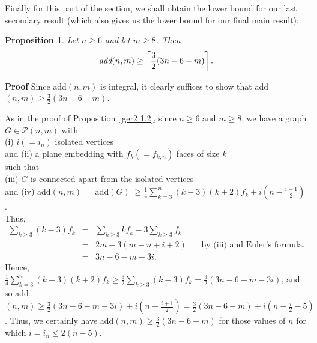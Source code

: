 \documentclass{article}
\newtheorem{Proposition}[Theorem]{Proposition}
\newtheorem{Proof of Theorem}{Proof of Theorem}
\begin{document}
Finally for this part of the section,
we shall obtain the lower bound for our last secondary result
(which also gives us the lower bound for our final main result):















\begin{Proposition} \label{add712}
Let $n \geq 6$ and let $m \geq 8$.
Then 
\begin{displaymath}
\emph{add}(n,m) \geq \left \lceil \frac{3}{2} (3n-6-m) \right \rceil.
\end{displaymath}
\end{Proposition}
\textbf{Proof}
Since add$(n,m)$ is integral,
it clearly suffices to show that
add$(n,m) \geq \frac{3}{2} (3n-6-m)$.

As in the proof of Proposition~\ref{ger2 1.2},
since $n \geq 6$ and $m \geq 8$,
we have a graph $G \in \mathcal{P}(n,m)$ with \\
(i) $i(=i_{n})$ isolated vertices \\
and (ii) a plane embedding with $f_{k}(=f_{k,n})$ faces of size $k$ \\
such that \\
(iii) $G$ is connected apart from the isolated vertices \\
and (iv) add$(n,m) = |\textrm{add}(G)| \geq 
\frac{1}{4} \sum_{k=3}^{n}(k-3)(k+2)f_{k} +i(n- \frac{i+1}{2})$. \\

Thus,
\begin{eqnarray*}
\sum_{k \geq 3} (k-3) f_{k} & = & \sum_{k \geq 3} kf_{k} - 3 \sum_{k \geq 3} f_{k} \\
& = & 2m - 3(m-n+i+2) \phantom{ww} \textrm{ by (iii) and Euler's formula.} \\
& = & 3n-6-m-3i.
\end{eqnarray*}
Hence, 
$\frac{1}{4} \sum_{k=3}^{n}(k-3)(k+2)f_{k} \geq \frac{3}{2} \sum_{k \geq 3} (k-3) f_{k} = \frac{3}{2}(3n-6-m-3i)$,
and so add$(n,m) \geq \frac{3}{2}(3n-6-m-3i) + i \left( n - \frac{i+1}{2} \right) 
= \frac{3}{2}(3n-6-m) + i \left( n - \frac{i}{2} -5 \right)$.
Thus, we certainly have add$(n,m) \geq \frac{3}{2} (3n-6-m)$
for those values of $n$ for which $i=i_{n} \leq 2(n-5)$. \\
\end{document}
